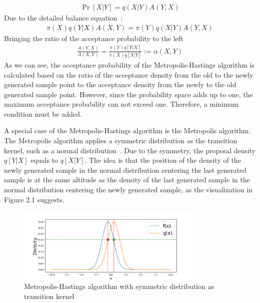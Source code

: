 \begin{align}
\Pr[X|Y] = q(X|Y) A(Y, X)
\end{align}
Due to the detailed balance equation~\cite{mcmc_practice}:
\begin{align}
\pi(X) q(Y|X) A(X, Y) = \pi(Y) q(X|Y) A(Y, X)
\end{align}
Bringing the ratio of the acceptance probability to the left
\begin{align}
\frac{A(Y, X)}{A(X, Y)} = \frac{\pi(Y)q[Y|X]}{\pi(X)q[X|Y]} := \alpha(X, Y)
\end{align} 
As we can see, the acceptance probability of the Metropolis-Hastings algorithm is calculated based on the ratio of the acceptance density from the old to the newly generated sample point to the acceptance density from the newly to the old generated sample point. However, since the probability space adds up to one, the maximum acceptance probability can not exceed one. Therefore, a minimum condition must be added.

A special case of the Metropolis-Hastings algorithm is the Metropolis algorithm. The Metropolis algorithm applies a symmetric distribution as the transition kernel, such as a normal distribution~\cite{metropolis}. Due to the symmetry, the proposal density $q[Y|X]$ equals to $q[X|Y]$. The idea is that the position of the density of the newly generated sample in the normal distribution centering the last generated sample is at the same altitude as the density of the last generated sample in the normal distribution centering the newly generated sample, as the visualization in Figure 2.1 suggests. 
\begin{figure}[H]
    \centering
    \includegraphics[width=0.8\textwidth]{figures/mcmc_example/proof.png}
    \captionsetup{width=.8\textwidth}
    \caption{Metropolis-Hastings algorithm with symmetric distribution as transition kernel}
    \label{fig:enter-label}
\end{figure}

